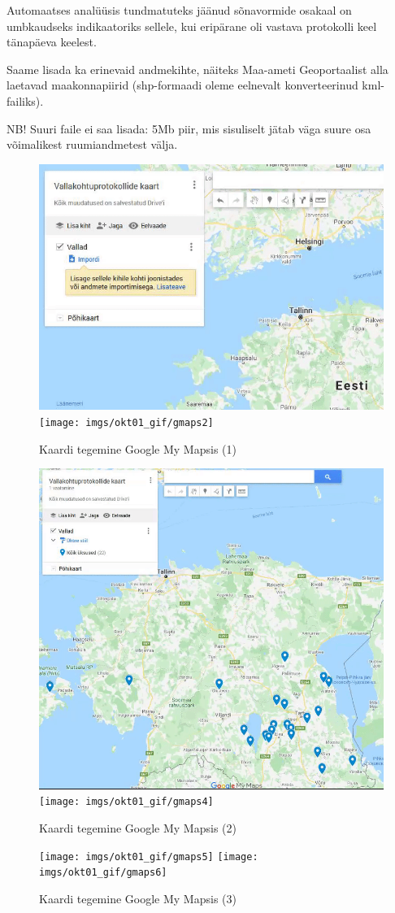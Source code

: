 \documentclass[
]{book}
\begin{document}
Automaatses analüüsis tundmatuteks jäänud sõnavormide osakaal on umbkaudseks indikaatoriks sellele, kui eripärane oli vastava protokolli keel tänapäeva keelest.

Saame lisada ka erinevaid andmekihte, näiteks Maa-ameti Geoportaalist alla laetavad maakonnapiirid (shp-formaadi oleme eelnevalt konverteerinud kml-failiks).

NB! Suuri faile ei saa lisada: 5Mb piir, mis sisuliselt jätab väga suure osa võimalikest ruumiandmetest välja.

\begin{figure}

{\centering \includegraphics[width=0.5\linewidth,height=1\textheight]{imgs/okt01_gif/gmaps1} \texttt{[image: imgs/okt01\_gif/gmaps2]} 

}

\caption{Kaardi tegemine Google My Mapsis (1)}\label{fig:mymaps1}
\end{figure}

\begin{figure}

{\centering \includegraphics[width=0.5\linewidth,height=1\textheight]{imgs/okt01_gif/gmaps3} \texttt{[image: imgs/okt01\_gif/gmaps4]} 

}

\caption{Kaardi tegemine Google My Mapsis (2)}\label{fig:mymaps2}
\end{figure}

\begin{figure}

{\centering \texttt{[image: imgs/okt01\_gif/gmaps5]} \texttt{[image: imgs/okt01\_gif/gmaps6]} 

}

\caption{Kaardi tegemine Google My Mapsis (3)}\label{fig:mymaps3}
\end{figure}
\end{document}
